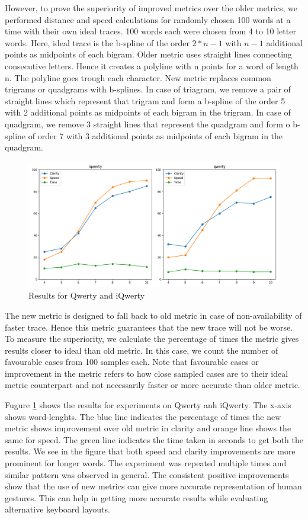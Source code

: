 \documentclass[MTech]{iitmdiss}
\begin{document}
However, to prove the superiority of improved metrics over the older metrics, we performed distance and speed calculations for randomly chosen 100 words at a time with their own ideal traces. 100 words each were chosen from 4 to 10 letter words. Here, ideal trace is the b-spline of the order $2*n-1$ with $n-1$ additional points as midpoints of each bigram. Older metric uses straight lines connecting consecutive letters. Hence it creates a polyline with n points for a word of length n. The polyline goes trough each character. New metric replaces common trigrams or quadgrams with b-splines. In case of triagram, we remove a pair of straight lines which represent that trigram and form a b-spline of the order 5 with 2 additional points as midpoints of each bigram in the trigram. In case of quadgram, we remove 3 straight lines that represent the quadgram and form o b-spline of order 7 with 3 additional points as midpoints of each bigram in the quadgram. 


\begin{figure}[h!] 
	\centering
	\includegraphics[scale=0.5]{Images/result}
	\caption{Results for Qwerty and iQwerty}
	\label{fig:results}
\end{figure}


The new metric is designed to fall back to old metric in case of non-availability of faster trace. Hence this metric guarantees that the new trace will not be worse. To measure the superiority, we calculate the percentage of times the metric gives results closer to ideal than old metric. In this case, we count the number of favourable cases from 100 samples each. Note that favourable cases or improvement in the metric refers to how close sampled cases are to their ideal metric counterpart and not necessarily faster or more accurate than older metric.


Fugure \ref{fig:results} shows the results for experiments on Qwerty anh iQwerty. The x-axis shows word-lenghts. The blue line indicates the percentage of times the new metric shows improvement over old metric in clarity and orange line shows the same for speed. The green line indicates the time taken in seconds to get both the results.  We see in the figure that both speed and clarity improvements are more prominent for longer words. The experiment was repeated multiple times and similar pattern was observed in general. The consistent positive improvements show that the use of new metrics can give more accurate representation of human gestures. This can help in getting more accurate results while evaluating alternative keyboard layouts.
\end{document}
